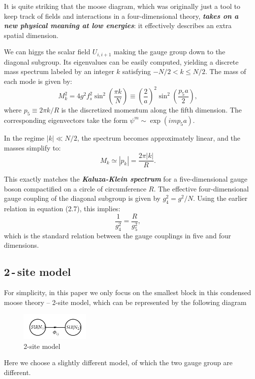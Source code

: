 \documentclass[12pt]{article}
\numberwithin{equation}{section}
\newcommand{\tif}[1]{\textit{\textbf{#1}}}
\begin{document}
    It is quite striking that the moose diagram, which was originally just a tool to keep track of fields and interactions in a four-dimensional theory, \tif{takes on a new physical meaning at low energies}: it effectively describes an extra spatial dimension.

We can higgs the scalar field $U_{i,i+1}$ making the gauge group down to the diagonal subgroup. Its eigenvalues can be easily computed, yielding a discrete mass spectrum labeled by an integer $k$ satisfying $-N/2 < k \leq N/2$. The mass of each mode is given by:
\begin{equation}
M_k^2 = 4g^2 f_s^2 \sin^2\left( \frac{\pi k}{N} \right)
\equiv \left( \frac{2}{a} \right)^2 \sin^2\left( \frac{p_5 a}{2} \right),
\end{equation}
where $p_5 \equiv 2\pi k / R$ is the discretized momentum along the fifth dimension. The corresponding eigenvectors take the form $\psi^m \sim \exp(i m p_5 a)$.

In the regime $|k| \ll N/2$, the spectrum becomes approximately linear, and the masses simplify to:
\begin{equation}
M_k \simeq |p_k| = \frac{2\pi |k|}{R}.
\end{equation}

This exactly matches the \tif{Kaluza-Klein spectrum} for a five-dimensional gauge boson compactified on a circle of circumference $R$. The effective four-dimensional gauge coupling of the diagonal subgroup is given by $g_4^2 = g^2 / N$. Using the earlier relation in equation (2.7), this implies:
\begin{equation}
\frac{1}{g_4^2} = \frac{R}{g_5^2},
\end{equation}
which is the standard relation between the gauge couplings in five and four dimensions.

\subsection{2\,-\,site model}
For simplicity, in this paper we only focus on the smallest block in this condensed moose theory -- 2-site model, which can be represented by the following diagram 
\begin{figure}[H]
    \centering
    \includegraphics[width=0.3\textwidth]{2-site.png}
    \caption{2-site model}
\end{figure}
\noindent
Here we choose a slightly different model, of which the two gauge group are different.  







\end{document}
